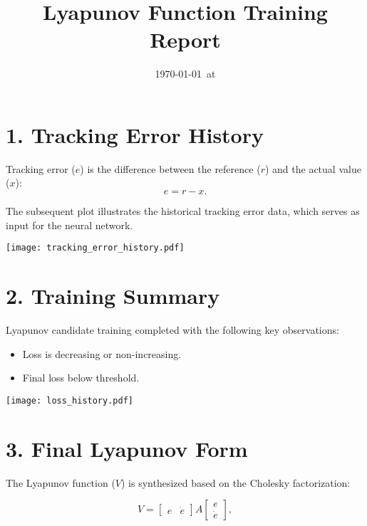 \documentclass[11pt]{article}
\title{Lyapunov Function Training Report}
\author{}
\date{\today\ at \currenttime}
\begin{document}
\maketitle
\thispagestyle{fancy}

\section*{1. Tracking Error History}
Tracking error ($e$) is the difference between the reference ($r$) and the actual value ($x$):
\begin{equation}
e = r - x.
\end{equation}

\indent The subsequent plot illustrates the historical tracking error data, which serves as input for the neural network.

\begin{center}
\texttt{[image: tracking\_error\_history.pdf]}
\end{center}

\section*{2. Training Summary}
Lyapunov candidate training completed with the following key observations:
\begin{itemize}
  \item  Loss is decreasing or non-increasing.
  \item  Final loss below threshold.
\end{itemize}

\begin{center}
\texttt{[image: loss\_history.pdf]}
\end{center}

\section*{3. Final Lyapunov Form}
The Lyapunov function ($V$) is synthesized based on the Cholesky factorization:

\begin{equation}
V = 
\begin{bmatrix}
e & \dot{e}
\end{bmatrix}
A
\begin{bmatrix}
e \\
\dot{e}
\end{bmatrix},
\end{equation}
\end{document}
